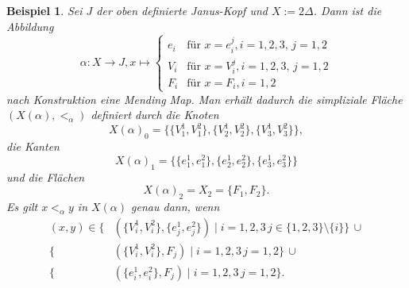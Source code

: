 \documentclass[12pt,titlepage]{article}
\newtheorem{bsp}{Beispiel}[section]
\begin{document}
  \begin{bsp}
  Sei $J$ der oben definierte Janus-Kopf und $X:= 2\Delta$. Dann ist die Abbildung 
  \[
  \alpha: X \to J, x \mapsto 
  \begin{cases}
e_i & \text{für } x =e_i^j ,i=1,2,3,\,j=1,2\\
V_i &\text{für } x =V_i^j,i=1,2,3,\,j=1,2\\
F_i &\text{für } x=F_i , i=1,2 
\end{cases}
  \]
  nach Konstruktion eine Mending Map. Man erhält dadurch die simpliziale Fläche $(X(\alpha),<_\alpha)$ definiert durch die Knoten
  \[
  X(\alpha)_0=\{\{V_1^1,V_1^2\},\{V_2^1,V_2^2\},\{V_3^1,V_3^2\}\},
  \]
  die Kanten
  \[
  X(\alpha)_1=\{\{e_1^1,e_1^2\},\{e_2^1,e_2^2\},\{e_3^1,e_3^2\}\}
  \]
  und die Flächen 
  \[
X(\alpha)_2=X_2=\{F_1,F_2\} .
  \]
  Es gilt $x<_{\alpha}y$ in $X(\alpha)$ genau dann, wenn
  \begin{align*}
 (x,y) \in \{&(\{V_i^1,V_i^2\}, \{e_j^1,e_j^2\})\mid i=1,2,3 \, j\in\{1,2,3\} \setminus \{i\}\}\, \cup\\
  \{&(\{V_i^1,V_i^2\}, F_j)\mid i=1,2,3 \, j=1,2 \} \,\cup\\
  \{&(\{e_i^1,e_i^2\}, F_j)\mid i=1,2,3 \, j=1,2 \}. 
\end{align*}
 \end{bsp}
\end{document}
